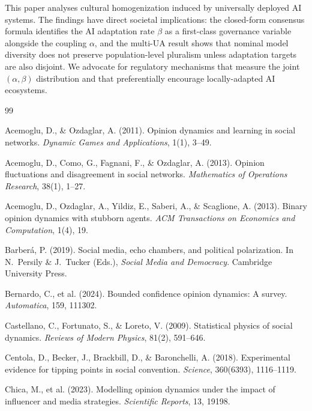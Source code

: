 \documentclass{article}
\theoremstyle{plain}
\theoremstyle{definition}
\theoremstyle{remark}
\begin{document}
This paper analyses cultural homogenization induced by universally
deployed AI systems.  The findings have direct societal implications:
the closed-form consensus formula identifies the AI adaptation rate
$\beta$ as a first-class governance variable alongside the coupling
$\alpha$, and the multi-UA result shows that nominal model diversity
does not preserve population-level pluralism unless adaptation
targets are also disjoint.  We advocate for regulatory mechanisms
that measure the joint $(\alpha,\beta)$ distribution and that
preferentially encourage locally-adapted AI ecosystems.

\begin{thebibliography}{99}

Acemoglu, D., \& Ozdaglar, A. (2011).
Opinion dynamics and learning in social networks.
\textit{Dynamic Games and Applications}, 1(1), 3--49.

Acemoglu, D., Como, G., Fagnani, F., \& Ozdaglar, A. (2013).
Opinion fluctuations and disagreement in social networks.
\textit{Mathematics of Operations Research}, 38(1), 1--27.

Acemoglu, D., Ozdaglar, A., Yildiz, E., Saberi, A., \& Scaglione, A. (2013).
Binary opinion dynamics with stubborn agents.
\textit{ACM Transactions on Economics and Computation}, 1(4), 19.

Barber\'{a}, P. (2019).
Social media, echo chambers, and political polarization.
In N.~Persily \& J.~Tucker (Eds.),
\textit{Social Media and Democracy}.
Cambridge University Press.

Bernardo, C., et al. (2024).
Bounded confidence opinion dynamics: A survey.
\textit{Automatica}, 159, 111302.

Castellano, C., Fortunato, S., \& Loreto, V. (2009).
Statistical physics of social dynamics.
\textit{Reviews of Modern Physics}, 81(2), 591--646.

Centola, D., Becker, J., Brackbill, D., \& Baronchelli, A. (2018).
Experimental evidence for tipping points in social convention.
\textit{Science}, 360(6393), 1116--1119.

Chica, M., et al. (2023).
Modelling opinion dynamics under the impact of influencer and media strategies.
\textit{Scientific Reports}, 13, 19198.


\end{thebibliography}
\end{document}
